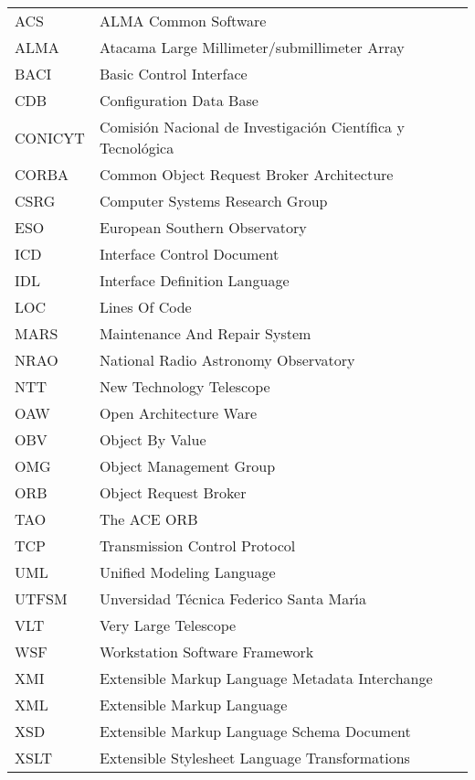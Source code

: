 \begin{table}[h!t]
  \begin{tabular}{ll}
    ACS   & ALMA Common Software \\
    ALMA  & Atacama Large Millimeter/submillimeter Array \\
    BACI  & Basic Control Interface\\
    CDB   & Configuration Data Base\\
    CONICYT & Comisi\'on Nacional de Investigación Cient\'ifica y Tecnol\'ogica\\
    CORBA &  Common Object Request Broker Architecture\\
    CSRG  & Computer Systems Research Group \\
    ESO   & European Southern Observatory \\
    ICD   & Interface Control Document\\
    IDL   & Interface Definition Language \\
    LOC   & Lines Of Code\\
    MARS  & Maintenance And Repair System\\
    NRAO  & National Radio Astronomy Observatory \\
    NTT   & New Technology Telescope\\
    OAW   & Open Architecture Ware\\
    OBV   & Object By Value\\
    OMG   & Object Management Group \\
    ORB   & Object Request Broker \\
    TAO   & The ACE ORB \\
    TCP   & Transmission Control Protocol \\
    UML   & Unified Modeling Language\\
    UTFSM & Unversidad T\'ecnica Federico Santa Mar\'\i a \\
    VLT   & Very Large Telescope\\
    WSF   & Workstation Software Framework\\
    XMI   & Extensible Markup Language Metadata Interchange\\
    XML   & Extensible Markup Language\\
    XSD   & Extensible Markup Language Schema Document\\
    XSLT  & Extensible Stylesheet Language Transformations\\

  \end{tabular}
\end{table}

